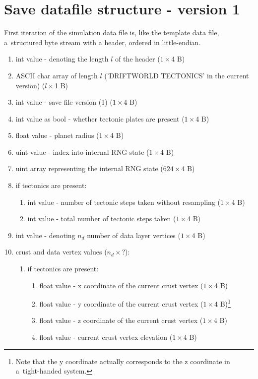 \section{Save datafile structure - version 1}
\label{sec:save-datafile-structure}
First iteration of the simulation data file is, like the template data file, a~structured byte stream with a header, ordered in little-endian.

\begin{enumerate}
\item int value - denoting the length $l$ of the header ($1\times$4 B)
\item ASCII char array of length $l$ ('DRIFTWORLD TECTONICS' in the current version) ($l\times$1 B)
\item int value - save file version (1) ($1\times$4 B)
\item int value as bool - whether tectonic plates are present ($1\times$4 B)
\item float value - planet radius ($1\times$4 B)
\item uint value - index into internal RNG state ($1\times$4 B)
\item uint array representing the internal RNG state ($624\times$4 B)
\item if tectonics are present:
\begin{enumerate}
\item int value - number of tectonic steps taken without resampling ($1\times$4 B)
\item int value - total number of tectonic steps taken ($1\times$4 B)
\end{enumerate}
\item int value - denoting $n_d$ number of data layer vertices ($1\times$4 B)
\item crust and data vertex values ($n_d\times$?):
\begin{enumerate}
\item if tectonics are present:
\begin{enumerate}
\item float value - x coordinate of the current crust vertex ($1\times$4 B)
\item float value - y coordinate of the current crust vertex ($1\times$4 B)\footnote{Note that the y coordinate actually corresponds to the z coordinate in a~tight-handed system.}
\item float value - z coordinate of the current crust vertex ($1\times$4 B)
\item float value - current crust vertex elevation ($1\times$4 B)

\end{enumerate}
\end{enumerate}
\end{enumerate}
